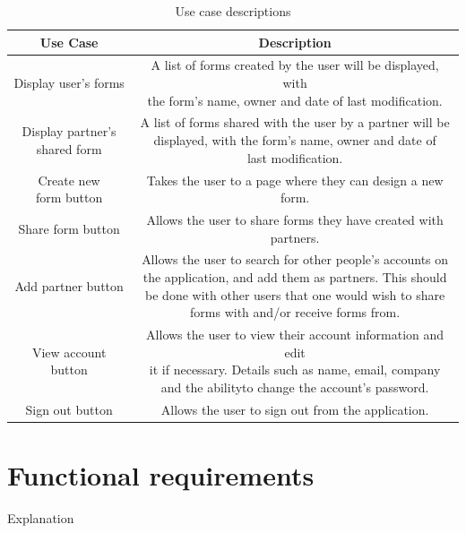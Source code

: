         \begin{table}[b]
            \centering
            \begin{tabular}{|c|c|}
                \hline
                Use Case & Description\\
                \hline
                \hline
                Display user's forms & \makecell{A list of forms created by the user will be displayed, with\\the form's name, owner and date of last modification.}\\
                \hline
                \makecell{Display partner's\\shared form} & \makecell{A list of forms shared with the user by a partner will be\\displayed, with the form's name, owner and date of\\last modification.}\\
                \hline
                \makecell{Create new\\form button} & Takes the user to a page where they can design a new form.\\
                \hline
                Share form button & \makecell{Allows the user to share forms they have created with\\partners.}\\
                \hline
                Add partner button & \makecell{Allows the user to search for other people's accounts on\\the application, and add them as partners. This should\\be done with other users that one would wish to share\\ forms with and/or receive forms from.}\\
                \hline
                View account button & \makecell{Allows the user to view their account information and edit\\it if necessary. Details such as name, email, company\\and the abilityto change the account's password.}\\
                \hline
                Sign out button & Allows the user to sign out from the application.\\
                \hline
            \end{tabular}
            \caption{Use case descriptions}
        \end{table}

\section{Functional requirements}
Explanation

